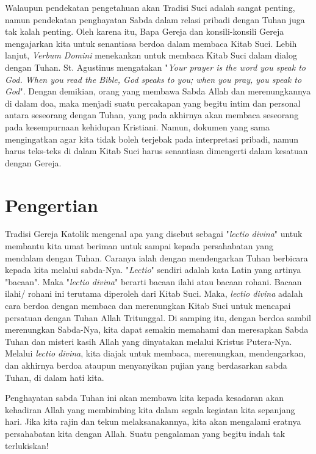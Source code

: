 Walaupun pendekatan pengetahuan akan Tradisi Suci adalah sangat penting, namun pendekatan penghayatan Sabda dalam relasi pribadi dengan Tuhan juga tak kalah penting. Oleh karena itu, Bapa Gereja dan konsili-konsili Gereja mengajarkan kita untuk senantiasa berdoa dalam membaca Kitab Suci. Lebih lanjut, \textit{Verbum Domini} menekankan untuk membaca Kitab Suci dalam dialog dengan Tuhan. St. Agustinus mengatakan "\textit{Your prayer is the word you speak to God. When you read the Bible, God speaks to you; when you pray, you speak to God}". Dengan demikian, orang yang membawa Sabda Allah dan merenungkannya di dalam doa, maka menjadi suatu percakapan yang begitu intim dan personal antara seseorang dengan Tuhan, yang pada akhirnya akan membaca seseorang pada kesempurnaan kehidupan Kristiani. Namun, dokumen yang sama mengingatkan agar kita tidak boleh terjebak pada interpretasi pribadi, namun harus teks-teks di dalam Kitab Suci harus senantiasa dimengerti dalam kesatuan dengan Gereja.

\section{Pengertian}
Tradisi Gereja Katolik mengenal apa yang disebut sebagai "\textit{lectio divina}" untuk membantu kita umat beriman untuk sampai kepada persahabatan yang mendalam dengan Tuhan. Caranya ialah dengan mendengarkan Tuhan berbicara kepada kita melalui sabda-Nya. "\textit{Lectio}" sendiri adalah kata Latin yang artinya "bacaan". Maka "\textit{lectio divina}" berarti bacaan ilahi atau bacaan rohani. Bacaan ilahi/ rohani ini terutama diperoleh dari Kitab Suci. Maka, \textit{lectio divina} adalah cara berdoa dengan membaca dan merenungkan Kitab Suci untuk mencapai persatuan dengan Tuhan Allah Tritunggal. Di samping itu, dengan berdoa sambil merenungkan Sabda-Nya, kita dapat semakin memahami dan meresapkan Sabda Tuhan dan misteri kasih Allah yang dinyatakan melalui Kristus Putera-Nya. Melalui \textit{lectio divina}, kita diajak untuk membaca, merenungkan, mendengarkan, dan akhirnya berdoa ataupun menyanyikan pujian yang berdasarkan sabda Tuhan, di dalam hati kita. 

Penghayatan sabda Tuhan ini akan membawa kita kepada kesadaran akan kehadiran Allah yang membimbing kita dalam segala kegiatan kita sepanjang hari. Jika kita rajin dan tekun melaksanakannya, kita akan mengalami eratnya persahabatan kita dengan Allah. Suatu pengalaman yang begitu indah tak terlukiskan!

